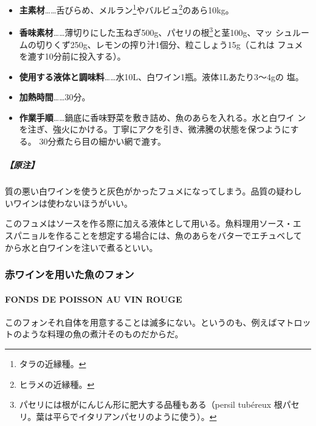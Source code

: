 \documentclass[twoside,12Q,b5j]{escoffierltjsbook}
\newenvironment{recette}{\begin{small}\begin{spacing}{1}\begin{multicols}{2}}{\end{multicols}\end{spacing}\end{small}}
\begin{document}
\begin{recette}
\begin{itemize}
\item
  \textbf{主素材}\ldots{}\ldots{}舌びらめ、メルラン\footnote{タラの近縁種。}やバルビュ\footnote{ヒラメの近縁種。}のあら10kg。
\item
  \textbf{香味素材}\ldots{}\ldots{}薄切りにした玉ねぎ500g、パセリの根\footnote{パセリには根がにんじん形に肥大する品種もある（persil
    tubéreux 根パセリ。葉は平らでイタリアンパセリのように使う）。}と茎100g、マッ
  シュルームの切りくず250g、レモンの搾り汁1個分、粒こしょう15g（これは
  フュメを漉す10分前に投入する）。
\item
  \textbf{使用する液体と調味料}\ldots{}\ldots{}水10L、白ワイン1瓶。液体1Lあたり3〜4gの
  塩。
\item
  \textbf{加熱時間}\ldots{}\ldots{}30分。
\item
  \textbf{作業手順}\ldots{}\ldots{}鍋底に香味野菜を敷き詰め、魚のあらを入れる。水と白ワイ
  ンを注ぎ、強火にかける。丁寧にアクを引き、微沸騰の状態を保つようにする。
  30分煮たら目の細かい網で漉す。
\end{itemize}

\subparagraph{【原注】}\label{ux539fux6ce8-2}

質の悪い白ワインを使うと灰色がかったフュメになってしまう。品質の疑わし
いワインは使わないほうがいい。

このフュメはソースを作る際に加える液体として用いる。魚料理用ソース・エ
スパニョルを作ることを想定する場合には、魚のあらをバターでエチュベして
から水と白ワインを注いで煮るといい。

\vspace*{1.7\zw}

\subsubsection{赤ワインを用いた魚のフォン}\label{ux8d64ux30efux30a4ux30f3ux3092ux7528ux3044ux305fux9b5aux306eux30d5ux30a9ux30f3}

\paragraph{FONDS DE POISSON AU VIN
ROUGE}\label{fonds-de-poisson-au-vin-rouge}


このフォンそれ自体を用意することは滅多にない。というのも、例えばマトロッ
トのような料理の魚の煮汁そのものだからだ。


\end{recette}
\end{document}
